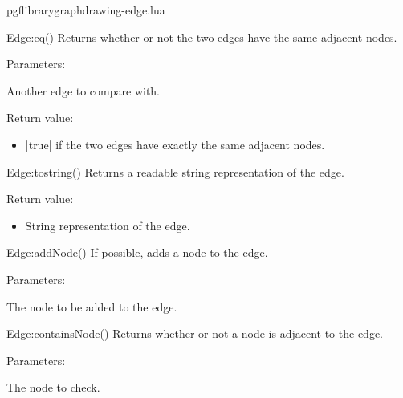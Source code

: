 
\begin{filedescription}{pgflibrarygraphdrawing-edge.lua}


\begin{luacommand}{{Edge:\textunderscore{}\textunderscore{}eq}()}
Returns whether or not the two edges have the same adjacent nodes. 

Parameters:
\begin{parameterdescription}
	\item[\meta{other}] Another edge to compare with. 
\end{parameterdescription}


Return value:
\begin{itemize} \item[] |true| if the two edges have exactly the same adjacent nodes.  \end{itemize}


\end{luacommand}\begin{luacommand}{{Edge:\textunderscore{}\textunderscore{}tostring}()}
Returns a readable string representation of the edge. 


Return value:
\begin{itemize} \item[] String representation of the edge.  \end{itemize}


\end{luacommand}\begin{luacommand}{{Edge:addNode}()}
If possible, adds a node to the edge. 

Parameters:
\begin{parameterdescription}
	\item[\meta{node}] The node to be added to the edge. 
\end{parameterdescription}



\end{luacommand}\begin{luacommand}{{Edge:containsNode}()}
Returns whether or not a node is adjacent to the edge. 

Parameters:
\begin{parameterdescription}
	\item[\meta{node}] The node to check. 
\end{parameterdescription}



\end{luacommand}
\end{filedescription}
